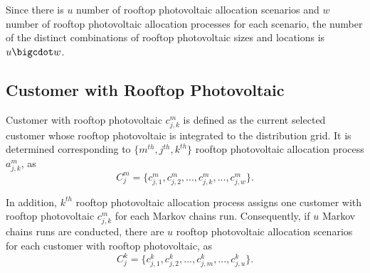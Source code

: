 Since there is $u$ number of rooftop photovoltaic allocation scenarios and $w$ number of rooftop photovoltaic allocation processes for each scenario, the number of the distinct combinations of rooftop photovoltaic sizes and locations is $u\bigcdot w$.
\subsection{Customer with Rooftop Photovoltaic}
Customer with rooftop photovoltaic $c^m_{j,k}$ is defined as the current selected customer whose rooftop photovoltaic is integrated to the distribution grid. It is determined corresponding to $\{m^{th},j^{th},k^{th}\}$ rooftop photovoltaic allocation process $a^m_{j,k}$, as
\begin{equation}\label{cpv1}
\mathit{C^m_j}=\{c^m_{j,1},c^m_{j,2},...,c^m_{j,k},...,c^m_{j,w}\}.
\end{equation}

In addition, $k^{th}$ rooftop photovoltaic allocation process assigns one customer with rooftop photovoltaic $c^m_{j,k}$ for each Markov chains run. Consequently, if $u$ Markov chains runs are conducted, there are $u$ rooftop photovoltaic allocation scenarios for each customer with rooftop photovoltaic, as
\begin{equation}\label{cpv2}
\mathit{C^k_j}=\{c^k_{j,1},c^k_{j,2},...,c^k_{j,m},...,c^k_{j,u}\}.
\end{equation}
